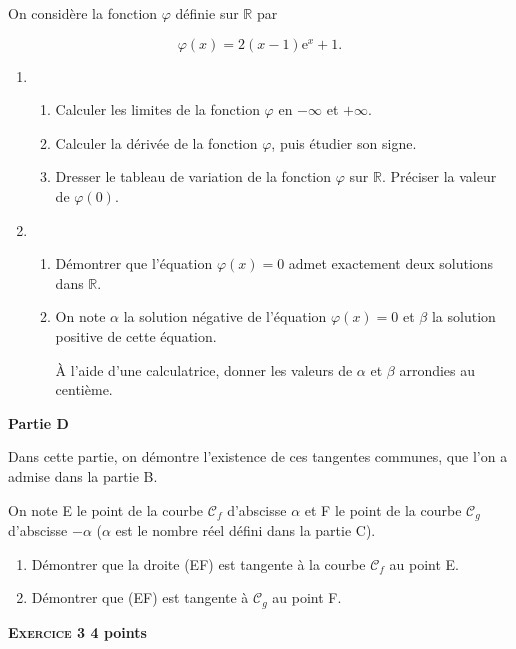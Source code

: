 \documentclass[10pt]{article}
\newcommand{\R}{\mathbb{R}}
\begin{document}
On considère la fonction $\varphi$ définie sur  $\R$ par 

\[\varphi(x) = 2(x -1)\text{e}^x + 1.\]
 
\begin{enumerate}
\item 
	\begin{enumerate}
		\item Calculer les limites de la fonction $\varphi$ en $- \infty$ et $+ \infty$. 
		\item Calculer la dérivée de la fonction $\varphi$, puis étudier son signe. 
		\item Dresser le tableau de variation de la fonction $\varphi$ sur $\R$. Préciser la valeur de $\varphi(0)$.
	\end{enumerate} 
\item
	\begin{enumerate}
		\item Démontrer que l'équation $\varphi(x) = 0$ admet exactement deux solutions dans $\R$. 
		\item On note $\alpha$ la solution négative de l'équation $\varphi(x) = 0$ et $\beta$ la solution positive de cette équation.
		 
À l'aide d'une calculatrice, donner les valeurs de $\alpha$ et $\beta$ arrondies au centième.
	\end{enumerate} 
\end{enumerate}

\bigskip
 
\textbf{Partie D}

\medskip

Dans cette partie, on démontre l'existence de ces tangentes communes, que l'on a admise dans la partie B.
 
On note E le point de la courbe $\mathcal{C}_{f}$ d'abscisse $\alpha$ et F le point de la courbe $\mathcal{C}_{g}$ d'abscisse $- \alpha$ ($\alpha$ est le nombre réel défini dans la partie C).

\medskip
 
\begin{enumerate}
\item Démontrer que la droite (EF) est tangente à la courbe $\mathcal{C}_{f}$ au point E. 
\item Démontrer que (EF) est tangente à $\mathcal{C}_{g}$ au point F. 
\end{enumerate}

\vspace{0,5cm}

\textbf{\textsc{Exercice 3} \hfill 4 points}
\end{document}
